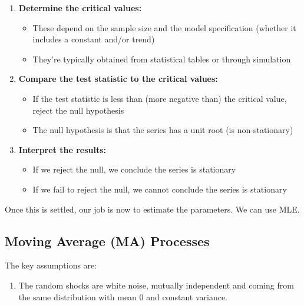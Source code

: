 \documentclass{article}
\begin{document}
\begin{definition}
\begin{enumerate}
        \item \textbf{Determine the critical values:}
        \begin{itemize}
            \item These depend on the sample size and the model specification (whether it includes a constant and/or trend)
            \item They're typically obtained from statistical tables or through simulation
        \end{itemize}

        \item \textbf{Compare the test statistic to the critical values:}
        \begin{itemize}
            \item If the test statistic is less than (more negative than) the critical value, reject the null hypothesis
            \item The null hypothesis is that the series has a unit root (is non-stationary)
        \end{itemize}

        \item \textbf{Interpret the results:}
        \begin{itemize}
            \item If we reject the null, we conclude the series is stationary
            \item If we fail to reject the null, we cannot conclude the series is stationary
        \end{itemize}
      \end{enumerate} 
    \end{definition}

    Once this is settled, our job is now to estimate the parameters. We can use MLE. 
    
  \subsection{Moving Average (MA) Processes}

    The key assumptions are: 
    \begin{enumerate}
      \item The random shocks are white noise, mutually independent and coming from the same distribution with mean $0$ and constant variance. 
    \end{enumerate}
\end{document}
